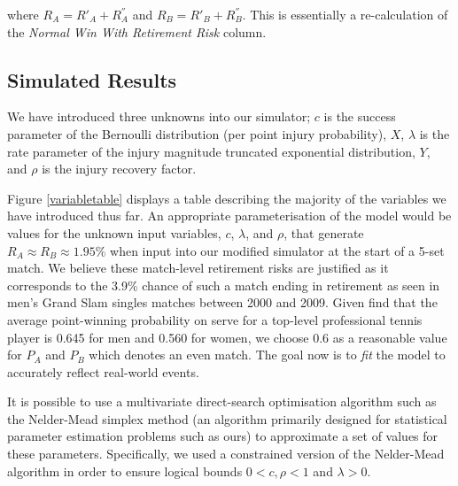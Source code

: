 \documentclass[letterpaper,12pt]{article}
\begin{document}
where $R_A = R'_A + R^{''}_A$ and $R_B = R'_B + R^{''}_B$.  This is essentially a re-calculation of the \textit{Normal Win With Retirement Risk} column.

\subsection{Simulated Results}

We have introduced three unknowns into our simulator; $c$ is the success parameter of the Bernoulli distribution (per point injury probability), $X$, $\lambda$ is the rate parameter of the injury magnitude truncated exponential distribution, $Y$, and $\rho$ is the injury recovery factor.

Figure \ref{variabletable} displays a table describing the majority of the variables we have introduced thus far.  An appropriate parameterisation of the model would be values for the unknown input variables, $c$, $\lambda$, and $\rho$, that generate $R_A \approx R_B \approx 1.95\%$ when input into our modified simulator at the start of a 5-set match.  We believe these match-level retirement risks are justified as it corresponds to the 3.9\% chance of such a match ending in retirement as seen in men's Grand Slam singles matches between 2000 and 2009.  Given \cite{dominance} find that the average point-winning probability on serve for a top-level professional tennis player is 0.645 for men and 0.560 for women, we choose 0.6 as a reasonable value for $P_A$ and $P_B$ which denotes an even match.  The goal now is to \textit{fit} the model to accurately reflect real-world events.

It is possible to use a multivariate direct-search optimisation algorithm such as the Nelder-Mead simplex method (an algorithm primarily designed for statistical parameter estimation problems such as ours) to approximate a set of values for these parameters.  Specifically, we used a constrained version of the Nelder-Mead algorithm in order to ensure logical bounds $0 < c, \rho < 1$ and $\lambda > 0$.
\end{document}
